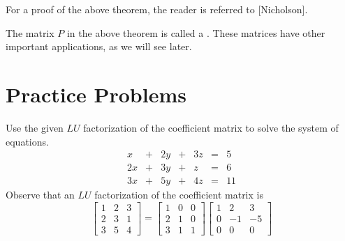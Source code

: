 \documentclass{ximera}
\begin{document}
For a proof of the above theorem, the reader is referred to [Nicholson].

The matrix $P$ in the above theorem is called a .  These matrices have other important applications, as we will see later.


\section*{Practice Problems}

\begin{problem}\label{prob:LU1}
Use the given $LU$ factorization of the coefficient matrix to solve the system of equations.
$$\begin{array}{ccccccc}
      x & +&2y&+&3z&= &5 \\
	 2x&+&3y&+&z&=&6\\
     3x& +&5y&+&4z&=&11
    \end{array}$$
Observe that an $LU$ factorization of the coefficient matrix is
\[
\begin{bmatrix}
1 & 2 & 3 \\
2 & 3 & 1 \\
3 & 5 & 4\end{bmatrix}
=
\begin{bmatrix}
1 & 0 & 0 \\
2 & 1 & 0 \\
3 & 1 & 1
\end{bmatrix} 
\begin{bmatrix}
1 & 2 & 3 \\
0 & -1 & -5 \\
0 & 0 & 0
\end{bmatrix}
\]
\end{problem}
\end{document}

